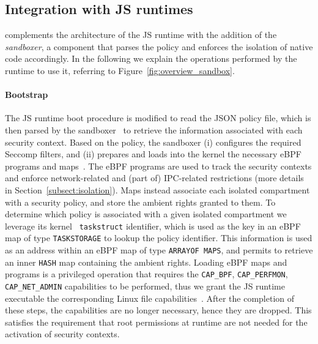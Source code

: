 \subsection{Integration with JS runtimes}
\label{subsect:arch}

\natisand complements the architecture of the JS runtime with the addition
of the {\em sandboxer}, a component that parses the policy and
enforces the isolation of native code accordingly. In the following we
explain the operations performed by the runtime to use it, referring to Figure~\ref{fig:overview_sandbox}.

\paragraph{Bootstrap}
The JS runtime boot procedure is modified to read the JSON policy
file, which is then parsed by the sandboxer~\blackcircle{$\alpha$} to
retrieve the information associated with each security context. Based
on the policy,
%
  the sandboxer (i) configures the required Seccomp filters, and (ii)
  prepares and loads into the kernel the necessary eBPF programs and
  maps~\blackcircle{$\beta$}. The eBPF programs are used to track the
  security contexts and enforce network-related and (part of)
  IPC-related restrictions (more details in
  Section~\ref{subsect:isolation}). Maps instead associate each
  isolated compartment with a security policy, and store the ambient
  rights granted to them. To determine which policy is associated with
  a given isolated compartment we leverage its kernel {\tt
    task\textunderscore struct} identifier, which is used as the key
  in an eBPF map of type {\tt TASK\textunderscore STORAGE} to lookup
  the policy identifier. This information is used as an address within
  an eBPF map of type {\tt ARRAY\textunderscore OF\textunderscore
    MAPS}, and permits to retrieve an inner {\tt HASH} map containing
  the ambient rights.
%
Loading eBPF maps and programs is a privileged operation
that requires the {\tt CAP\_BPF}, {\tt CAP\_PERFMON}, {\tt
  CAP\_NET\_ADMIN} capabilities to be performed, thus we grant the JS
runtime executable the corresponding Linux file
capabilities~\cite{file-based-capabilities}.  After the completion of
these steps, the capabilities are no longer necessary, hence they are
dropped. This satisfies the requirement that root permissions at
runtime are not needed for the activation of security contexts.

